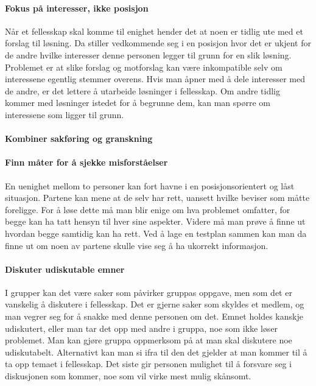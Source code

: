 \paragraph{Fokus på interesser, ikke posisjon}
Når et fellesskap skal komme til enighet hender det at noen er tidlig ute med et forslag til løsning.
Da stiller vedkommende seg i en posisjon hvor det er ukjent for de andre hvilke interesser denne personen legger til grunn for en slik løsning.
Problemet er at slike forslag og motforslag kan være inkompatible selv om interessene egentlig stemmer overens.
Hvis man åpner med å dele interesser med de andre, er det lettere å utarbeide løsninger i fellesskap.
Om andre tidlig kommer med løsninger istedet for å begrunne dem, kan man spørre om interessene som ligger til grunn.

\paragraph{Kombiner sakføring og granskning}

\paragraph{Finn måter for å sjekke misforståelser}
En uenighet mellom to personer kan fort havne i en posisjonsorientert og låst situasjon.
Partene kan mene at de selv har rett, uansett hvilke beviser som måtte foreligge.
For å løse dette må man blir enige om hva problemet omfatter, for begge kan ha tatt hensyn til hver sine aspekter.
Videre må man prøve å finne ut hvordan begge samtidig kan ha rett.
Ved å lage en testplan sammen kan man da finne ut om noen av partene skulle vise seg å ha ukorrekt informasjon.

\paragraph{Diskuter udiskutable emner}
I grupper kan det være saker som påvirker gruppas oppgave, men som det er vanskelig å diskutere i fellesskap.
Det er gjerne saker som skyldes et medlem, og man vegrer seg for å snakke med denne personen om det.
Emnet holdes kanskje udiskutert, eller man tar det opp med andre i gruppa, noe som ikke løser problemet.
Man kan gjøre gruppa oppmerksom på at man skal diskutere noe udiskutabelt.
Alternativt kan man si ifra til den det gjelder at man kommer til å ta opp temaet i fellesskap.
Det siste gir personen mulighet til å forsvare seg i diskusjonen som kommer, noe som vil virke mest mulig skånsomt.

